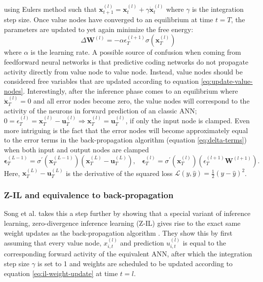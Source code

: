 \documentclass[a4paper,11pt]{article} %
\begin{document}
using Eulers method such that $\mathbf{x}_{t+1}^{(l)} = \mathbf{x}_{t}^{(l)} + \gamma \dot{\mathbf{x}}_t^{(l)}$ where $\gamma$ is the integration step size. Once value nodes have converged to an equilibrium at time $t=T$, the parameters are updated to yet again minimize the free energy:
\begin{equation} \label{eq:il-weight-update}
  \Delta \mathbf{W}^{(l)} = -\alpha \epsilon_T^{(l+1)} \sigma(\mathbf{x}_T^{(l)})
\end{equation}
where $\alpha$ is the learning rate. A possible source of confusion when coming from feedforward neural networks is that predictive coding networks do not propagate activity directly from value node to value node. Instead, value nodes should be considered free variables that are updated according to equation \ref{eq:update-value-nodes}. Interestingly, after the inference phase comes to an equilibrium where $\dot{\mathbf{x}}_T^{(l)} = 0$ and all error nodes become zero, the value nodes will correspond to the activity of the neurons in forward prediction of an classic ANN; $0 = \epsilon_{T}^{(l)}=\mathbf{x}_{T}^{(l)}-\mathbf{u}_{T}^{(l)}  \Rightarrow \mathbf{x}_{T}^{(l)} = \mathbf{u}_{T}^{(l)}$, if only the input node is clamped. Even more intriguing is the fact that the error nodes will become approximately equal to the error terms in the back-propagation algorithm (equation \ref{eq:delta-terms}) when both input and output nodes are clamped 
\begin{equation}
    \mathbf{\epsilon}_T^{(L-1)} = \sigma^{\prime}(\mathbf{x}_{T}^{(L-1)})\left(\mathbf{x}_{T}^{(L)} - \mathbf{u}_T^{(L)} \right), \hspace{10pt} \mathbf{\epsilon}_T^{(l)} = \sigma^{\prime}(\mathbf{x}_{T}^{(l)})\left(\epsilon_{T}^{(l+1)} \mathbf{W}^{(l+1)}\right).
\end{equation}
Here, $\mathbf{x}_{T}^{(L)} - \mathbf{u}_T^{(L)}$ is the derivative of the squared loss $\mathcal{L}(y, \hat{y}) = \frac{1}{2}\left( y - \hat{y}  \right)^2$. 

\subsubsection{Z-IL and equivalence to back-propagation}
Song et al. takes this a step further by showing that a special variant of inference learning, zero-divergence inference learning (Z-IL) gives rise to the exact same weight updates as the back-propagation algorithm \cite{PredictiveCodingNetworks}. They show this by first assuming that every value node, $x_{i,t}^{(l)}$ and prediction $u_{i,t}^{(l)}$ is equal to the corresponding forward activity of the equivalent ANN, after which the integration step size $\gamma$ is set to 1 and weights are scheduled to be updated according to equation \ref{eq:il-weight-update} at time $t=l$. 
\end{document}
